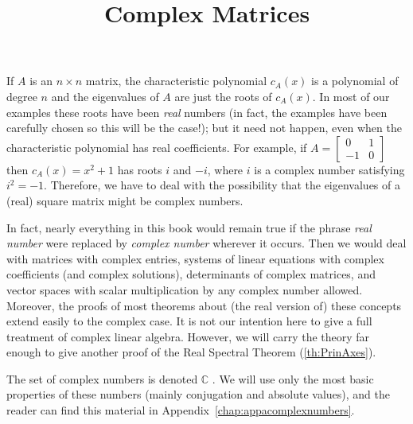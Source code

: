 \documentclass{ximera}
\title{Complex Matrices} \license{CC-BY 4.0}
\begin{document}
\begin{abstract}
\end{abstract}
\maketitle

If $A$ is an $n \times n$ matrix, the characteristic polynomial $c_{A}(x)$ is a polynomial of degree $n$ and the eigenvalues of $A$ are just the roots of $c_{A}(x)$. In most of our examples these roots have been \textit{real} numbers (in fact, the examples have been carefully chosen so this will be the case!); but it need not happen, even when the characteristic polynomial has real coefficients. For example, if $A = \left[ \begin{array}{rr}
0 & 1 \\
-1 & 0
\end{array}\right]$ then $c_{A}(x) = x^{2} + 1$ has roots $i$ and $-i$, where $i$ is a complex number satisfying $i^{2} = -1$. Therefore, we have to deal with the possibility that the eigenvalues of a (real) square matrix might be complex numbers.

In fact, nearly everything in this book would remain true if the phrase \textit{real number} were replaced by \textit{complex number}
 wherever it occurs. Then we would deal with matrices with complex
entries, systems of linear equations with complex coefficients (and
complex solutions), determinants of complex matrices, and vector spaces
with scalar multiplication by any complex number allowed. Moreover, the
proofs of most theorems about (the real version of) these concepts
extend easily to the complex case. It is not our intention here to give a
 full treatment of complex linear algebra. However, we will carry the
theory far enough to give another proof of the Real Spectral Theorem (\ref{th:PrinAxes}).

The set of complex numbers is denoted $\mathbb{C}$ . We will use only the most basic properties of these numbers (mainly conjugation and absolute values), and the reader can find this material in Appendix~\ref{chap:appacomplexnumbers}.
\end{document}
